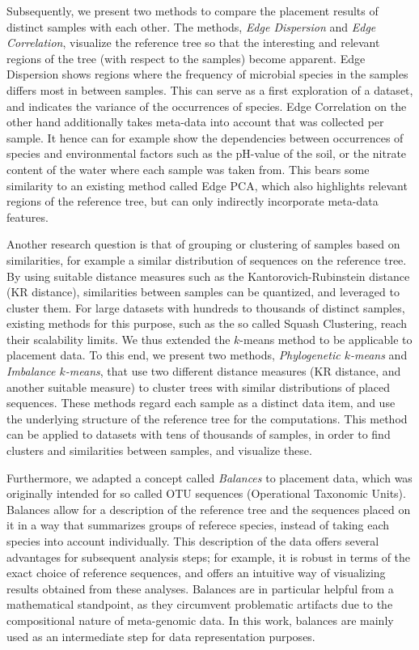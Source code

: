 Subsequently, we present two methods to compare the placement results of distinct samples with each other.
The methods, \emph{Edge Dispersion} and \emph{Edge Correlation}, visualize the reference tree so that
the interesting and relevant regions of the tree (with respect to the samples) become apparent.
Edge Dispersion shows regions where the frequency of microbial species in the samples differs most in between samples.
This can serve as a first exploration of a dataset, and indicates the variance of the occurrences of species.
Edge Correlation on the other hand additionally takes meta-data into account that was collected per sample.
It hence can for example show the dependencies between occurrences of species and environmental factors such as the
pH-value of the soil, or the nitrate content of the water where each sample was taken from.
This bears some similarity to an existing method called Edge PCA,
which also highlights relevant regions of the reference tree,
but can only indirectly incorporate meta-data features.

Another research question is that of grouping or clustering of samples based on similarities,
for example a similar distribution of sequences on the reference tree.
By using suitable distance measures such as the Kantorovich-Rubinstein distance (KR distance),
similarities between samples can be quantized, and leveraged to cluster them.
For large datasets with hundreds to thousands of distinct samples,
existing methods for this purpose, such as the so called Squash Clustering, reach their scalability limits.
We thus extended the $k$-means method to be applicable to placement data.
To this end, we present two methods, \emph{Phylogenetic $k$-means} and \emph{Imbalance $k$-means},
that use two different distance measures (KR distance, and another suitable measure)
to cluster trees with similar distributions of placed sequences.
These methods regard each sample as a distinct data item,
and use the underlying structure of the reference tree for the computations.
This method can be applied to datasets with tens of thousands of samples,
in order to find clusters and similarities between samples, and visualize these.

Furthermore, we adapted a concept called \emph{Balances} to placement data,
which was originally intended for so called OTU sequences (Operational Taxonomic Units).
Balances allow for a description of the reference tree and the sequences placed on it
in a way that summarizes groups of referece species, instead of taking each species into account individually.
This description of the data offers several advantages for subsequent analysis steps;
for example, it is robust in terms of the exact choice of reference sequences,
and offers an intuitive way of visualizing results obtained from these analyses.
Balances are in particular helpful from a mathematical standpoint,
as they circumvent problematic artifacts due to the compositional nature of meta-genomic data.
In this work, balances are mainly used as an intermediate step for data representation purposes.

